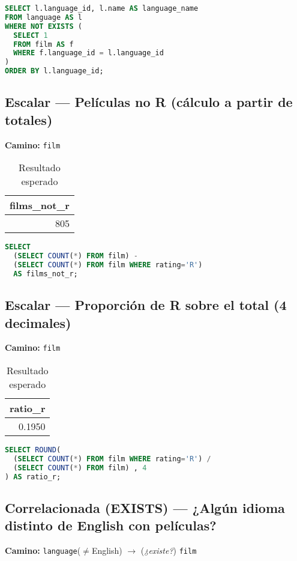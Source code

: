 \documentclass[12pt,a4paper]{article}
\begin{document}
\begin{lstlisting}[language=SQL]
SELECT l.language_id, l.name AS language_name
FROM language AS l
WHERE NOT EXISTS (
  SELECT 1
  FROM film AS f
  WHERE f.language_id = l.language_id
)
ORDER BY l.language_id;
\end{lstlisting}

\subsection{Escalar — Películas no R (cálculo a partir de totales)}
\textbf{Camino:} \texttt{film}

\begin{table}[h]
\centering
\caption{Resultado esperado}
\begin{tabular}{@{}r@{}}
\toprule
\textbf{films\_not\_r} \\
\midrule
805 \\
\bottomrule
\end{tabular}
\end{table}

\begin{lstlisting}[language=SQL]
SELECT
  (SELECT COUNT(*) FROM film) -
  (SELECT COUNT(*) FROM film WHERE rating='R')
  AS films_not_r;
\end{lstlisting}

\subsection{Escalar — Proporción de R sobre el total (4 decimales)}
\textbf{Camino:} \texttt{film}

\begin{table}[h]
\centering
\caption{Resultado esperado}
\begin{tabular}{@{}r@{}}
\toprule
\textbf{ratio\_r} \\
\midrule
0.1950 \\
\bottomrule
\end{tabular}
\end{table}

\begin{lstlisting}[language=SQL]
SELECT ROUND(
  (SELECT COUNT(*) FROM film WHERE rating='R') /
  (SELECT COUNT(*) FROM film) , 4
) AS ratio_r;
\end{lstlisting}

\subsection{Correlacionada (EXISTS) — ¿Algún idioma distinto de English con películas?}
\textbf{Camino:} \texttt{language}($\neq$English) $\rightarrow$ (\textit{¿existe?}) \texttt{film}
\end{document}
